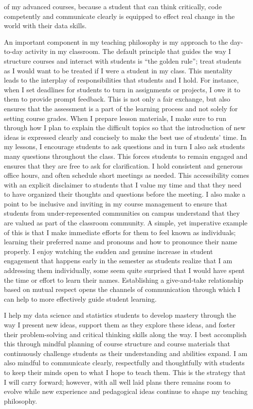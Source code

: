 \documentclass[letterpaper,12pt]{article}\usepackage[]{graphicx}\usepackage[]{color}
\begin{document}
of my advanced courses, because a student that can think critically, code competently and communicate clearly is equipped to effect real change in the world with their data skills.  

\indent	An important component in my teaching philosophy is my approach to the day-to-day activity in my classroom.  The default principle that guides the way I structure courses and interact with students is ``the golden rule''; treat students as I would want to be treated if I were a student in my class. This mentality leads to the interplay of responsibilities that students and I hold. For instance, when I set deadlines for students to turn in assignments or projects, I owe it to them to provide prompt feedback.  This is not only a fair exchange, but also ensures that the assessment is a part of the learning process and not solely for setting course grades. When I prepare lesson materials, I make sure to run through how I plan to explain the difficult topics so that the introduction of new ideas is expressed clearly and concisely to make the best use of students' time. In my lessons, I encourage students to ask questions and in turn I also ask students many questions throughout the class.  This forces students to remain engaged and ensures that they are free to ask for clarification. I hold consistent and generous office hours, and often schedule short meetings as needed. This accessibility comes with an explicit disclaimer to students that I value my time and that they need to have organized their thoughts and questions before the meeting. I also make a point to be inclusive and inviting in my course management to ensure that students from under-represented communities on campus understand that they are valued as part of the classroom community. A simple, yet imperative example of this is that I make immediate efforts for them to feel known as individuals; learning their preferred name and pronouns and how to pronounce their name properly. I enjoy watching the sudden and genuine increase in student engagement that happens early in the semester as students realize that I am addressing them individually, some seem quite surprised that I would have spent the time or effort to learn their names. Establishing a give-and-take relationship based on mutual respect opens the channels of communication through which I can help to more effectively guide student learning. 


I help my data science and statistics students to develop mastery through the way I present new ideas, support them as they explore these ideas, and foster their problem-solving and critical thinking skills along the way. I best accomplish this through mindful planning of course structure and course materials that continuously challenge students as their understanding and abilities expand. I am also mindful to communicate clearly, respectfully and thoughtfully with students to keep their minds open to what I hope to teach them.  This is the strategy that I will carry forward; however, with all well laid plans there remains room to evolve while new experience and pedagogical ideas continue to shape my teaching philosophy.


% 
% 
\end{document}
